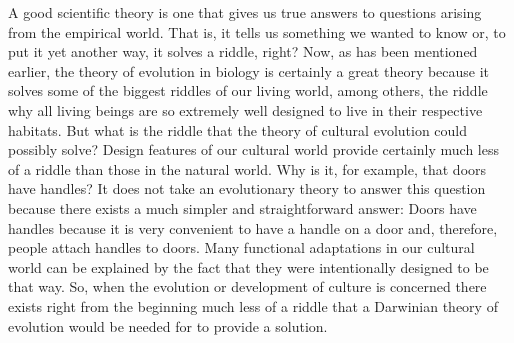 A good scientific theory is one that gives us true answers to questions
arising from the empirical world. That is, it tells us something we wanted to
know or, to put it yet another way, it solves a riddle, right? Now, as has
been mentioned earlier, the theory of evolution in biology is certainly a
great theory because it solves some of the biggest riddles of our living
world, among others, the riddle why all living beings are so extremely well
designed to live in their respective habitats. But what is the riddle that the
theory of cultural evolution could possibly solve?  Design features of our
cultural world provide certainly much less of a riddle than those in the
natural world. Why is it, for example, that doors have handles?  It does not
take an evolutionary theory to answer this question because there exists a
much simpler and straightforward answer: Doors have handles because it is
very convenient to have a handle on a door and, therefore, people attach
handles to doors. Many functional adaptations in our cultural world can be
explained by the fact that they were intentionally designed to be that way.
So, when the evolution or development of culture is concerned there exists
right from the beginning much less of a riddle that a Darwinian theory of
evolution would be needed for to provide a solution.

